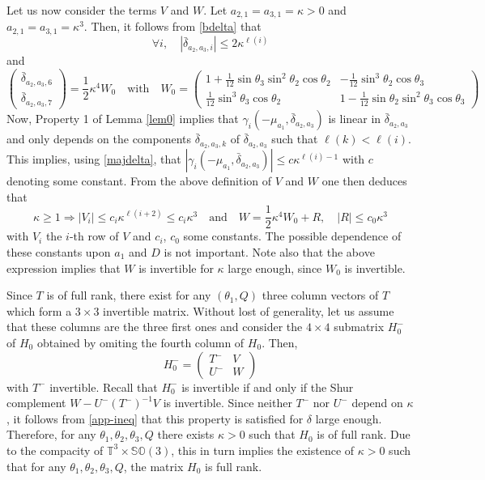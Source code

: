 \documentclass[a4paper,twoside]{article}
\def \TT {{\mathbb T}}
\def \finproof{\hfill\hbox{\vrule width1.0ex height1.5ex}}
\def \SO {{\mathbb S}{\mathbb O}}
\begin{document}
Let us now consider the terms $V$ and $W$. Let $a_{2,1}=a_{3,1} = \kappa>0$ and $a_{2,1}=a_{3,1} = \kappa^3$.
Then, it follows from \eqref{bdelta} that 
\begin{equation}
\label{majdelta}
\forall i, \quad |\bar \delta_{a_2,a_3,i}| \leq 2 \kappa^{\ell(i)} 
\end{equation}
and
\[
\begin{pmatrix}
\bar \delta_{a_2,a_3,6} \\
\bar \delta_{a_2,a_3,7}
\end{pmatrix}
=
\frac{1}{2} \kappa^4 W_0 \quad \text{with} \quad 
W_0= 
\begin{pmatrix}
1+ \frac{1}{12} \sin \theta_3 \sin^2 \theta_2 \cos \theta_2 & -\frac{1}{12} \sin^3 \theta_2 \cos \theta_3 \\
\frac{1}{12} \sin^3 \theta_3 \cos \theta_2 & 1 -\frac{1}{12} \sin \theta_2 \sin^2 \theta_3 \cos \theta_3
\end{pmatrix}
\]
Now, Property 1 of Lemma \ref{lem0} implies that $\gamma_i(-\mu_{a_1}, \bar \delta_{a_2,a_3})$ is linear in 
$\bar \delta_{a_2,a_3}$ and only depends on the components $\bar \delta_{a_2,a_3,k}$ of  $\bar \delta_{a_2,a_3}$ such
that $\ell(k) < \ell(i)$. This implies, using \eqref{majdelta}, that 
$|\gamma_i(-\mu_{a_1}, \bar \delta_{a_2,a_3})| \leq c \kappa^{\ell(i)-1}$ with $c$ denoting some constant. From 
the above definition of $V$ and $W$ one then deduces that 
\begin{equation}
\label{app-ineq}
\kappa \geq 1 \Longrightarrow 
|V_i| \leq c_i \kappa^{\ell(i+2)}  \leq c_i \kappa^3 \quad \text{and} \quad 
W= \frac{1}{2} \kappa^4 W_0 + R,\quad  |R| \leq c_0 \kappa^3
\end{equation}
with $V_i$ the $i$-th row of $V$ and $c_i$, $c_0$ some constants. The possible dependence of
these constants upon $a_1$ and $D$ is not important. Note also that the 
above expression implies that $W$ is invertible for $\kappa$ large enough, since $W_0$ is invertible.

Since $T$ is of full rank, there exist for any $(\theta_1,Q)$ three column vectors of $T$ which form a
$3 \times 3$ invertible matrix. Without lost of generality, let us assume that these columns are the 
three first ones and consider the $4 \times 4$ submatrix $H_0^-$ of $H_0$ obtained by 
omiting the fourth column of $H_0$. Then,
\[
H_0^-=
\begin{pmatrix}
T^- & V \\
U^- & W
\end{pmatrix}
\]
with $T^-$ invertible. Recall that $H_0^-$ is invertible if and only if the Shur complement $W- U^- (T^-)^{-1} V$ is invertible.
Since neither $T^-$ nor $U^-$ depend on $\kappa$, it follows from \eqref{app-ineq} that this property is satisfied 
for $\delta$ large enough. Therefore, for any $\theta_1, \theta_2, \theta_3,Q$ there exists $\kappa>0$ such that 
$H_0$ is of full rank. Due to the compacity of $\TT^3 \times \SO(3)$, this in turn implies the existence of 
$\kappa>0$ such that for any  $\theta_1, \theta_2, \theta_3,Q$, the matrix $H_0$ is full rank. \finproof
\vspace{.3cm}
\end{document}

